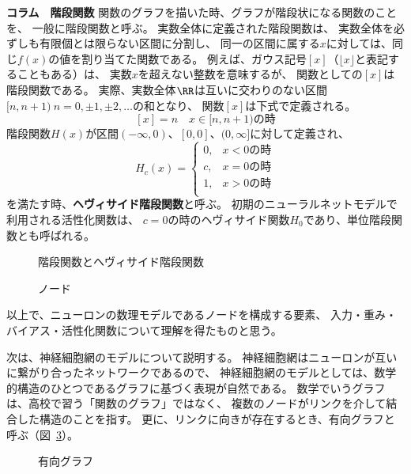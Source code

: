 \begin{itembox}{\bf コラム　階段関数}
  関数のグラフを描いた時、グラフが階段状になる関数のことを、
  一般に階段関数と呼ぶ。
  実数全体に定義された階段関数は、
  実数全体を必ずしも有限個とは限らない区間に分割し、
  同一の区間に属する$x$に対しては、同じ$f(x)$の値を割り当てた関数である。
  例えば、ガウス記号$[x]$（$\lfloor x\rfloor$と表記することもある）は、
  実数$x$を超えない整数を意味するが、
  関数としての$[x]$は階段関数である。
  実際、実数全体$\RR$は互いに交わりのない区間
  $[n, n+1)\ n = 0, \pm 1, \pm 2, \dots$の和となり、
  関数$[x]$は下式で定義される。
  \[
    [x] = n\quad \text{$x \in [n, n+1)$の時}
  \]
  階段関数$H(x)$が区間$(-\infty, 0)$、$[0,0]$、$(0, \infty]$に対して定義され、
  \[
    H_c(x) =
    \begin{cases}
      0, & \text{$x < 0$の時}\\
      c, & \text{$x = 0$の時}\\
      1, & \text{$x > 0$の時}\\
    \end{cases}
  \]
  を満たす時、\textbf{ヘヴィサイド階段関数}と呼ぶ。
  初期のニューラルネットモデルで利用される活性化関数は、
  $c = 0$の時のヘヴィサイド関数$H_0$であり、単位階段関数とも呼ばれる。
\end{itembox}

\begin{figure}
  \centering
  
  \caption{階段関数とヘヴィサイド階段関数}
  \label{fig:step-function}
\end{figure}

\begin{figure}
  \centering
  
  \caption{ノード}
  \label{fig:node}
\end{figure}

以上で、ニューロンの数理モデルであるノードを構成する要素、
入力・重み・バイアス・活性化関数について理解を得たものと思う。

次は、神経細胞網のモデルについて説明する。
神経細胞網はニューロンが互いに繋がり合ったネットワークであるので、
神経細胞網のモデルとしては、数学的構造のひとつであるグラフに基づく表現が自然である。
数学でいうグラフは、高校で習う「関数のグラフ」ではなく、
複数のノードがリンクを介して結合した構造のことを指す。
更に、リンクに向きが存在するとき、有向グラフと呼ぶ（図~\ref{fig:graph}）。

\begin{figure}
  \centering
  
  \caption{有向グラフ}
  \label{fig:graph}
\end{figure}

